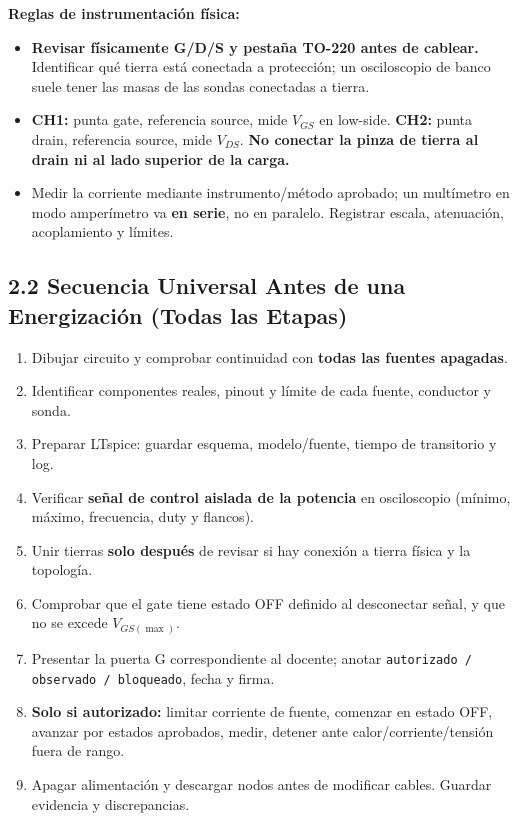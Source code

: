 \documentclass[10pt, a4paper, landscape]{article}
\begin{document}
\noindent
\textbf{Reglas de instrumentación física:}
\begin{itemize}[noitemsep, topsep=2pt]
    \item \textbf{Revisar físicamente G/D/S y pestaña TO-220 antes de cablear.} Identificar qué tierra está conectada a protección; un osciloscopio de banco suele tener las masas de las sondas conectadas a tierra.
    \item \textbf{CH1:} punta gate, referencia source, mide $V_{GS}$ en low-side. \textbf{CH2:} punta drain, referencia source, mide $V_{DS}$. \textbf{\textcolor{warnred}{No conectar la pinza de tierra al drain ni al lado superior de la carga.}}
    \item Medir la corriente mediante instrumento/método aprobado; un multímetro en modo amperímetro va \textbf{en serie}, no en paralelo. Registrar escala, atenuación, acoplamiento y límites.
\end{itemize}

\subsection*{2.2 Secuencia Universal Antes de una Energización (Todas las Etapas)}
\begin{enumerate}[noitemsep, topsep=2pt]
    \item Dibujar circuito y comprobar continuidad con \textbf{todas las fuentes apagadas}.
    \item Identificar componentes reales, pinout y límite de cada fuente, conductor y sonda.
    \item Preparar LTspice: guardar esquema, modelo/fuente, tiempo de transitorio y log.
    \item Verificar \textbf{señal de control aislada de la potencia} en osciloscopio (mínimo, máximo, frecuencia, duty y flancos).
    \item Unir tierras \textbf{solo después} de revisar si hay conexión a tierra física y la topología.
    \item Comprobar que el gate tiene estado OFF definido al desconectar señal, y que no se excede $V_{GS(\max)}$.
    \item Presentar la puerta G correspondiente al docente; anotar \texttt{autorizado / observado / bloqueado}, fecha y firma.
    \item \textbf{Solo si autorizado:} limitar corriente de fuente, comenzar en estado OFF, avanzar por estados aprobados, medir, detener ante calor/corriente/tensión fuera de rango.
    \item Apagar alimentación y descargar nodos antes de modificar cables. Guardar evidencia y discrepancias.
\end{enumerate}
\end{document}
